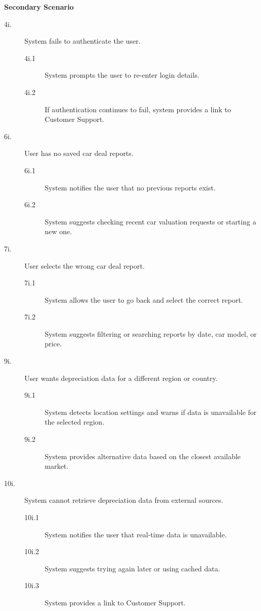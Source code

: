 \documentclass[]{article}
\begin{document}
\begin{enumerate}
\begin{enumerate}[{\bf {BE}1.}]
	\textbf{Secondary Scenario}

	\begin{description}
		\item[4i.] System fails to authenticate the user.
		\begin{description}
			\item[4i.1] System prompts the user to re-enter login details.
			\item[4i.2] If authentication continues to fail, system provides a link to Customer Support.
		\end{description}

		\item[6i.] User has no saved car deal reports.
		\begin{description}
			\item[6i.1] System notifies the user that no previous reports exist.
			\item[6i.2] System suggests checking recent car valuation requests or starting a new one.
		\end{description}

		\item[7i.] User selects the wrong car deal report.
		\begin{description}
			\item[7i.1] System allows the user to go back and select the correct report.
			\item[7i.2] System suggests filtering or searching reports by date, car model, or price.
		\end{description}

		\item[9i.] User wants depreciation data for a different region or country.
		\begin{description}
			\item[9i.1] System detects location settings and warns if data is unavailable for the selected region.
			\item[9i.2] System provides alternative data based on the closest available market.
		\end{description}

		\item[10i.] System cannot retrieve depreciation data from external sources.
		\begin{description}
			\item[10i.1] System notifies the user that real-time data is unavailable.
			\item[10i.2] System suggests trying again later or using cached data.
			\item[10i.3] System provides a link to Customer Support.
		\end{description}
	\end{description}


\end{enumerate}
\end{enumerate}
\end{document}
